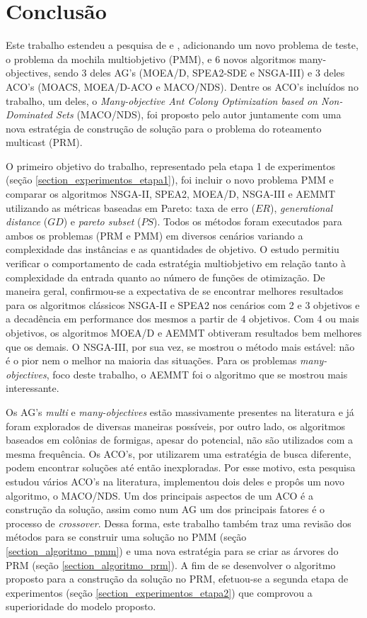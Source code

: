 \chapter[Conclusão]{Conclusão}
Este trabalho estendeu a pesquisa de \cite{Bueno2010} e \cite{Lafeta2016}, adicionando um novo problema de teste, o problema da mochila multiobjetivo (PMM), e 6 novos algoritmos many-objectives, sendo 3 deles AG's (MOEA/D, SPEA2-SDE e NSGA-III) e 3 deles ACO's (MOACS, MOEA/D-ACO e MACO/NDS). Dentre os ACO's incluídos no trabalho, um deles, o \textit{Many-objective Ant Colony Optimization based on Non-Dominated Sets} (MACO/NDS), foi proposto pelo autor juntamente com uma nova estratégia de construção de solução para o problema do roteamento multicast (PRM).

O primeiro objetivo do trabalho, representado pela etapa 1 de experimentos (seção \ref{section_experimentos_etapa1}), foi incluir o novo problema PMM e comparar os algoritmos NSGA-II, SPEA2, MOEA/D, NSGA-III e AEMMT utilizando as métricas baseadas em Pareto: taxa de erro ($ER$), \textit{generational distance} ($GD$) e \textit{pareto subset} ($PS$). Todos os métodos foram executados para ambos os problemas (PRM e PMM) em diversos cenários variando a complexidade das instâncias e as quantidades de objetivo. O estudo permitiu verificar o comportamento de cada estratégia multiobjetivo em relação tanto à complexidade da entrada quanto ao número de funções de otimização. De maneira geral, confirmou-se a expectativa de se encontrar melhores resultados para os algoritmos clássicos NSGA-II e SPEA2 nos cenários com 2 e 3 objetivos e a decadência em performance dos mesmos a partir de 4 objetivos. Com 4 ou mais objetivos, os algoritmos MOEA/D e AEMMT obtiveram resultados bem melhores que os demais. O NSGA-III, por sua vez, se mostrou o método mais estável: não é o pior nem o melhor na maioria das situações. Para os problemas \textit{many-objectives}, foco deste trabalho, o AEMMT foi o algoritmo que se mostrou mais interessante.

Os AG's \textit{multi} e \textit{many-objectives} estão massivamente presentes na literatura e já foram explorados de diversas maneiras possíveis, por outro lado, os algoritmos baseados em colônias de formigas, apesar do potencial, não são utilizados com a mesma frequência. Os ACO's, por utilizarem uma estratégia de busca diferente, podem encontrar soluções até então inexploradas. Por esse motivo, esta pesquisa estudou vários ACO's na literatura, implementou dois deles e propôs um novo algoritmo, o MACO/NDS. Um dos principais aspectos de um ACO é a construção da solução, assim como num AG um dos principais fatores é o processo de \textit{crossover}. Dessa forma, este trabalho também traz uma revisão dos métodos para se construir uma solução no PMM (seção \ref{section_algoritmo_pmm}) e uma nova estratégia para se criar as árvores do PRM (seção \ref{section_algoritmo_prm}). A fim de se desenvolver o algoritmo proposto para a construção da solução no PRM, efetuou-se a segunda etapa de experimentos (seção \ref{section_experimentos_etapa2}) que comprovou a superioridade do modelo proposto.

